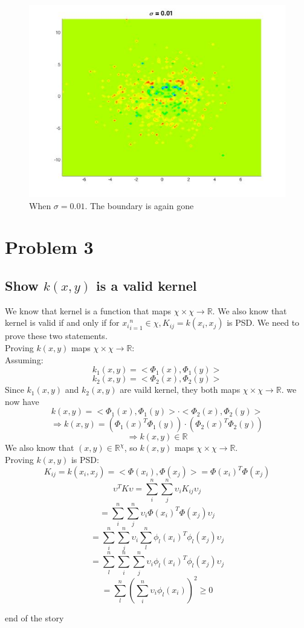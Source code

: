 \documentclass[twoside]{article}
\theoremstyle{definition}
\theoremstyle{definition}
\theoremstyle{remark}
\def\R{{\mathbb R}}
\begin{document}
\begin{figure}[H]
\centering
\includegraphics[width=120mm]{sigma_001.jpg}
\caption{ When $\sigma = 0.01$. The boundary is again gone\label{problem2Pic6}}
\end{figure}

\section{Problem 3}
\subsection{Show $k(x,y)$ is a valid kernel}
We know that kernel is a function that maps $\chi \times \chi \rightarrow \R$. 
We also know that kernel is valid if and only if for ${x_i}_{i=1}^n \in \chi, K_{ij} = k(x_i,x_j)$ is PSD. We need to prove these two statements.\\ 
Proving $k(x,y)$ maps $\chi \times \chi \rightarrow \R$:\\ 
Assuming:
\[k_1(x,y) = <\Phi_1(x),\Phi_1(y)>\]
\[k_2(x,y) = <\Phi_2(x),\Phi_2(y)>\]
Since $k_1(x,y)$ and $k_2(x,y)$ are vaild kernel, they both maps $\chi \times \chi \rightarrow \R$. 
we now have 
\[k(x,y) = <\Phi_1(x),\Phi_1(y)>\cdot <\Phi_2(x),\Phi_2(y)>\]
\[\Rightarrow k(x,y) = (\Phi_1(x)^T \Phi_1(y))\cdot(\Phi_2(x)^T\Phi_2(y))\]
\[\Rightarrow k(x,y) \in \R\]
We also know that $(x,y) \in \R^\chi$, so $k(x,y)$ maps $\chi \times \chi \rightarrow \R$.\\
Proving $k(x,y)$ is PSD:
\[K_{ij} = k(x_i,x_j) =  <\Phi(x_i),\Phi(x_j)> =\Phi(x_i)^T\Phi(x_j) \]
\[\upsilon^T K \upsilon = \sum_i^n \sum_j^n \upsilon_i K_{ij} \upsilon_j\]
\[=\sum_i^n \sum_j^n \upsilon_i \Phi(x_i)^T\Phi(x_j) \upsilon_j\]
\[=\sum_i^n \sum_j^n \upsilon_i \sum_l^n \phi_l(x_i)^T\phi_l(x_j) \upsilon_j\]
\[=\sum_l^n \sum_i^n \sum_j^n \upsilon_i \phi_l(x_i)^T\phi_l(x_j) \upsilon_j\]
\[=\sum_l^n(\sum_i^n \upsilon_i \phi_l(x_i))^2 \geq 0\]



 
end of the story
\end{document}
